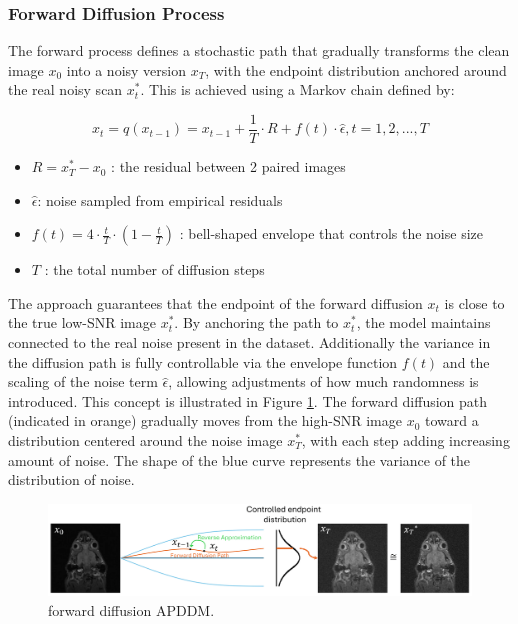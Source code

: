\documentclass[twocolumn]{article}
\begin{document}
\subsubsection{Forward Diffusion Process}
The forward process defines a stochastic path that gradually transforms the clean image $x_0$ into a noisy version $x_T$, with the endpoint distribution anchored around the real noisy scan $x_t^*$. 
This is achieved using a Markov chain defined by:

\begin{equation}\label{eq:Markov chain}
x_t=q(x_{t-1})=x_{t-1}+\frac{1}{T}\cdot R+f(t)\cdot \hat{\epsilon}, t=1,2,...,T
\end{equation}
\begin{itemize}
    \item $R=x_T^*-x_0$ : the residual between 2 paired images
    \item $\hat{\epsilon} $: noise sampled from empirical residuals
    \item $f(t)=4 \cdot \frac{t}{T} \cdot (1-\frac{t}{T})$ : bell-shaped envelope that controls the noise size
    \item $T$ : the total number of diffusion steps
\end{itemize}


The approach guarantees that the endpoint of the forward diffusion $x_t$ is close to the true low-SNR image $x_t^*$. 
By anchoring the path to $x_t^*$, the model maintains connected to the real noise present in the dataset. 
Additionally the variance in the diffusion path is fully controllable via the envelope function $f(t)$ and the scaling of the noise term $\hat{\epsilon} $, allowing adjustments of how much randomness is introduced. 
This concept is illustrated in Figure \ref{fig:forward APDDM}. The forward diffusion path (indicated in orange) gradually moves from the high-SNR image $x_0$ toward a distribution centered around the noise image $x_T^*$, with each step adding increasing amount of noise. 
The shape of the blue curve represents the variance of the distribution of noise.

\begin{figure}[H]
    \centering
    \includegraphics[width=1\linewidth]{forward APDDM.png}
    \caption{forward diffusion APDDM.}
    \label{fig:forward APDDM}
\end{figure}
\end{document}
